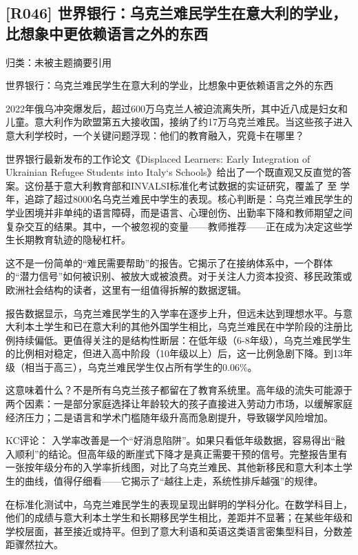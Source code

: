 \documentclass[11pt]{ctexart}
\begin{document}
\subsection{[R046] 世界银行：乌克兰难民学生在意大利的学业，比想象中更依赖语言之外的东西}
{\small\color{refgray}归类：未被主题摘要引用}

世界银行：乌克兰难民学生在意大利的学业，比想象中更依赖语言之外的东西

2022年俄乌冲突爆发后，超过600万乌克兰人被迫流离失所，其中近八成是妇女和儿童。意大利作为欧盟第五大接收国，接纳了约17万乌克兰难民。当这些孩子进入意大利学校时，一个关键问题浮现：他们的教育融入，究竟卡在哪里？

世界银行最新发布的工作论文《Displaced Learners: Early Integration of Ukrainian Refugee Students into Italy‘s Schools》给出了一个既直观又反直觉的答案。这份基于意大利教育部和INVALSI标准化考试数据的实证研究，覆盖了 至 学年，追踪了超过8000名乌克兰难民中学生的表现。核心判断是：乌克兰难民学生的学业困境并非单纯的语言障碍，而是语言、心理创伤、出勤率下降和教师期望之间复杂交互的结果。其中，一个被忽视的变量——教师推荐——正在成为决定这些学生长期教育轨迹的隐秘杠杆。

这不是一份简单的“难民需要帮助”的报告。它揭示了在接纳体系中，一个群体的“潜力信号”如何被识别、被放大或被浪费。对于关注人力资本投资、移民政策或欧洲社会结构的读者，这里有一组值得拆解的数据逻辑。

报告数据显示，乌克兰难民学生的入学率在逐步上升，但远未达到理想水平。与意大利本土学生和已在意大利的其他外国学生相比，乌克兰难民在中学阶段的注册比例持续偏低。更值得关注的是结构性断层：在低年级（6-8年级），乌克兰难民学生的比例相对稳定，但进入高中阶段（10年级以上）后，这一比例急剧下降。到13年级（相当于高三），乌克兰难民学生仅占所有学生的0.06\%。

这意味着什么？不是所有乌克兰孩子都留在了教育系统里。高年级的流失可能源于两个因素：一是部分家庭选择让年龄较大的孩子直接进入劳动力市场，以缓解家庭经济压力；二是语言和学术门槛随年级升高而急剧提升，导致辍学风险增加。

KC评论： 入学率改善是一个“好消息陷阱”。如果只看低年级数据，容易得出“融入顺利”的结论。但高年级的断崖式下降才是真正需要干预的信号。完整报告里有一张按年级分布的入学率折线图，对比了乌克兰难民、其他新移民和意大利本土学生的曲线，值得仔细看——它揭示了“越往上走，系统性排斥越强”的规律。

在标准化测试中，乌克兰难民学生的表现呈现出鲜明的学科分化。在数学科目上，他们的成绩与意大利本土学生和长期移民学生相比，差距并不显著；在某些年级和学校层面，甚至接近或持平。但到了意大利语和英语这类语言密集型科目，分数差距骤然拉大。
\end{document}
